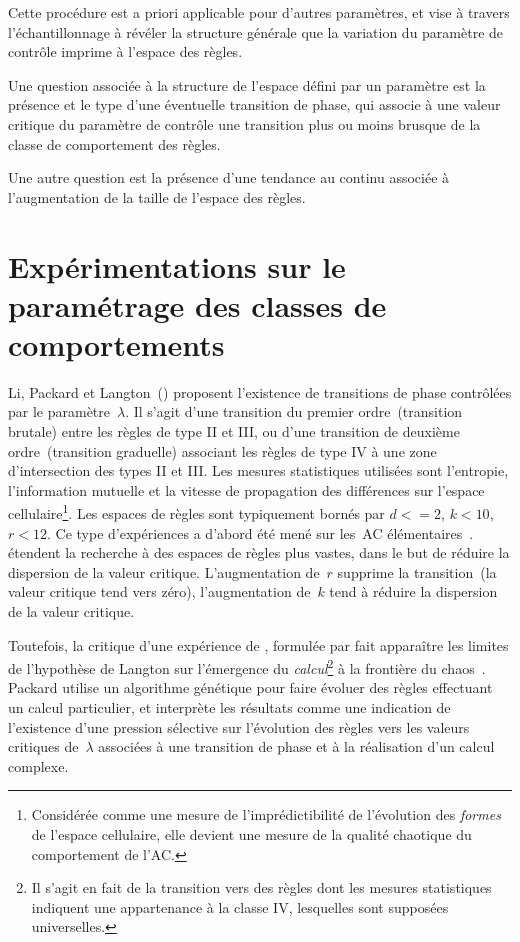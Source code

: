 Cette proc\'edure est a priori applicable pour d'autres param\`etres, %
et vise \`a travers l'\'echantillonnage \`a r\'ev\'eler la structure g\'en\'erale
que la variation du param\`etre de contr\^ole imprime \`a l'espace des r\`egles. %

Une question associ\'ee \`a la structure de l'espace d\'efini par un
param\`etre est la pr\'esence et le type d'une \'eventuelle transition de
phase, qui associe \`a une valeur critique du param\`etre de contr\^ole une
transition plus ou moins brusque de la classe de comportement des
r\`egles. %

Une autre question est la pr\'esence d'une tendance au continu associ\'ee
\`a l'augmentation de la taille de l'espace des r\`egles. %

\section[param\'etrage des classes de comportements]%
{Exp\'erimentations sur le param\'etrage des classes de comportements}

Li, Packard et Langton~(\citeyear{Li90b}) proposent l'existence de
transitions de phase contr\^ol\'ees par le param\`etre~$\lambda$. %
Il s'agit d'une transition du premier ordre~(transition brutale) entre
les r\`egles de type II et III, %
ou d'une transition de deuxi\`eme ordre~(transition graduelle) associant
les r\`egles de type IV \`a une zone d'intersection des types II et III\@. %
Les mesures statistiques utilis\'ees sont l'entropie, l'information
mutuelle et la vitesse de propagation des diff\'erences sur l'espace
cellulaire\footnote{%
  Consid\'er\'ee comme une mesure de l'impr\'edictibilit\'e de l'\'evolution
  des \emph{formes} de l'espace cellulaire, elle devient une mesure
  de la qualit\'e chaotique du comportement de l'AC.}. %
Les espaces de r\`egles sont typiquement born\'es par $d <= 2$, $k < 10$,
$r < 12$. %
Ce type d'exp\'eriences a d'abord \'et\'e men\'e sur les~AC
\'el\'ementaires~\cite[]{Li90a}. %
\cite{Wootters90} \'etendent la recherche \`a des
espaces de r\`egles plus vastes, dans le but de r\'eduire la dispersion de
la valeur critique. %
L'augmentation de~$r$ supprime la transition~(la valeur critique tend
vers z\'ero), l'augmentation de~$k$ tend \`a r\'eduire la dispersion de la
valeur critique.

Toutefois, la critique d'une exp\'erience de \cite{Packard88},
formul\'ee par \cite{Mitchell93a} fait appara\^itre les limites
de l'hypoth\`ese de Langton sur l'\'emergence du \emph{calcul}\footnote{%
  Il s'agit en fait de la transition vers des r\`egles dont les mesures
  statistiques indiquent une appartenance \`a la classe IV, lesquelles
  sont suppos\'ees universelles.} %
\`a la fronti\`ere du chaos~\cite[]{Langton90,Langton92b}. %
Packard utilise un algorithme g\'en\'etique pour faire \'evoluer des r\`egles
effectuant un calcul particulier, et interpr\`ete les r\'esultats comme
une indication de l'existence d'une pression s\'elective sur l'\'evolution
des r\`egles vers les valeurs critiques de~$\lambda$ associ\'ees \`a une
transition de phase et \`a la r\'ealisation d'un calcul complexe.

